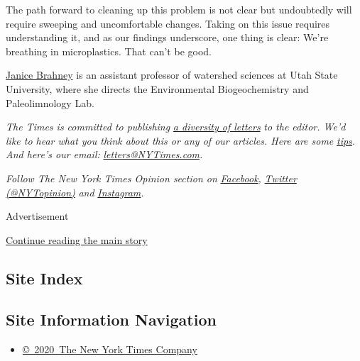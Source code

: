The path forward to cleaning up this problem is not clear but
undoubtedly will require sweeping and uncomfortable changes. Taking on
this issue requires understanding it, and as our findings underscore,
one thing is clear: We're breathing in microplastics. That can't be
good.

\href{https://qcnr.usu.edu/directory/brahney_janice}{Janice Brahney} is
an assistant professor of watershed sciences at Utah State University,
where she directs the Environmental Biogeochemistry and Paleolimnology
Lab.

\emph{The Times is committed to publishing}
\href{https://www.nytimes3xbfgragh.onion/2019/01/31/opinion/letters/letters-to-editor-new-york-times-women.html}{\emph{a
diversity of letters}} \emph{to the editor. We'd like to hear what you
think about this or any of our articles. Here are some}
\href{https://help.nytimes3xbfgragh.onion/hc/en-us/articles/115014925288-How-to-submit-a-letter-to-the-editor}{\emph{tips}}\emph{.
And here's our email:}
\href{mailto:letters@NYTimes.com}{\emph{letters@NYTimes.com}}\emph{.}

\emph{Follow The New York Times Opinion section on}
\href{https://www.facebookcorewwwi.onion/nytopinion}{\emph{Facebook}}\emph{,}
\href{http://twitter.com/NYTOpinion}{\emph{Twitter (@NYTopinion)}}
\emph{and}
\href{https://www.instagram.com/nytopinion/}{\emph{Instagram}}\emph{.}

Advertisement

\protect\hyperlink{after-bottom}{Continue reading the main story}

\hypertarget{site-index}{%
\subsection{Site Index}\label{site-index}}

\hypertarget{site-information-navigation}{%
\subsection{Site Information
Navigation}\label{site-information-navigation}}

\begin{itemize}
\tightlist
\item
  \href{https://help.nytimes3xbfgragh.onion/hc/en-us/articles/115014792127-Copyright-notice}{©~2020~The
  New York Times Company}
\end{itemize}

